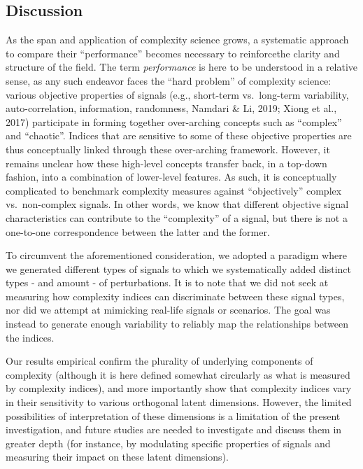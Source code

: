 \documentclass[
  man]{apa6}
\begin{document}
\hypertarget{discussion}{%
\subsection{Discussion}\label{discussion}}

As the span and application of complexity science grows, a systematic approach to compare their ``performance'' becomes necessary to reinforcethe clarity and structure of the field. The term \emph{performance} is here to be understood in a relative sense, as any such endeavor faces the ``hard problem'' of complexity science: various objective properties of signals (e.g., short-term vs.~long-term variability, auto-correlation, information, randomness, Namdari \& Li, 2019; Xiong et al., 2017) participate in forming together over-arching concepts such as ``complex'' and ``chaotic''. Indices that are sensitive to some of these objective properties are thus conceptually linked through these over-arching framework. However, it remains unclear how these high-level concepts transfer back, in a top-down fashion, into a combination of lower-level features. As such, it is conceptually complicated to benchmark complexity measures against ``objectively'' complex vs.~non-complex signals. In other words, we know that different objective signal characteristics can contribute to the ``complexity'' of a signal, but there is not a one-to-one correspondence between the latter and the former.

To circumvent the aforementioned consideration, we adopted a paradigm where we generated different types of signals to which we systematically added distinct types - and amount - of perturbations. It is to note that we did not seek at measuring how complexity indices can discriminate between these signal types, nor did we attempt at mimicking real-life signals or scenarios. The goal was instead to generate enough variability to reliably map the relationships between the indices.

Our results empirical confirm the plurality of underlying components of complexity (although it is here defined somewhat circularly as what is measured by complexity indices), and more importantly show that complexity indices vary in their sensitivity to various orthogonal latent dimensions. However, the limited possibilities of interpretation of these dimensions is a limitation of the present investigation, and future studies are needed to investigate and discuss them in greater depth (for instance, by modulating specific properties of signals and measuring their impact on these latent dimensions).
\end{document}
